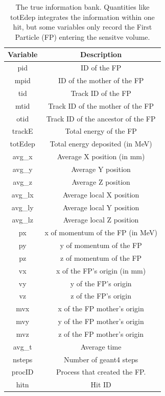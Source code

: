 \begin{table}[h]
	\small
	\begin{center}
		\begin{tabular}{| c | c |}
			\hline \hline
			Variable    & Description  \\
			\hline
				pid         &   ID of the FP                     \\
				mpid        &   ID of the mother of the FP \\
				tid         &   Track ID of the FP\\
				mtid        &   Track ID of the mother of the FP  \\
				otid        &   Track ID of the ancestor of the FP \\
				trackE      &   Total energy of the FP \\
				totEdep     &   Total energy deposited (in MeV) \\
				avg\_x      &   Average X position  (in mm) \\
				avg\_y      &   Average Y position  \\
				avg\_z      &   Average Z position  \\
				avg\_lx     &   Average local X position \\
				avg\_ly     &   Average local Y position \\
				avg\_lz     &   Average local Z position \\
				px          &   x  of momentum of the FP (in MeV) \\
				py          &   y  of momentum of the FP \\
				pz          &   z  of momentum of the FP \\
				vx          &   x  of the FP's origin (in mm) \\
				vy          &   y  of the FP's origin \\
				vz          &   z  of the FP's origin \\
				mvx         &   x  of the FP mother's origin\\
				mvy         &   y  of the FP mother's origin \\
				mvz         &   z  of the FP mother's origin \\
				avg\_t      &   Average time \\
				nsteps      &   Number of geant4 steps \\
				procID      &   Process that created the FP.  \\
				hitn        &   Hit ID \\
			\hline \hline
		\end{tabular}
	\end{center}
	\caption{The true information bank. Quantities like totEdep integrates the information within one hit, but some
             variables only record the First Particle (FP) entering the sensitve volume.}\label{tab:trueInformation}
\end{table}



